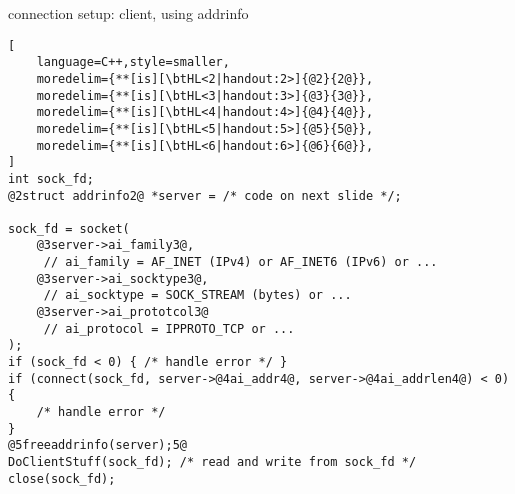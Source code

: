 \begin{frame}[fragile,label=connSetupClientAddrInfo]{connection setup: client, using addrinfo}
\begin{lstlisting}[
    language=C++,style=smaller,
    moredelim={**[is][\btHL<2|handout:2>]{@2}{2@}},
    moredelim={**[is][\btHL<3|handout:3>]{@3}{3@}},
    moredelim={**[is][\btHL<4|handout:4>]{@4}{4@}},
    moredelim={**[is][\btHL<5|handout:5>]{@5}{5@}},
    moredelim={**[is][\btHL<6|handout:6>]{@6}{6@}},
]
int sock_fd; 
@2struct addrinfo2@ *server = /* code on next slide */;

sock_fd = socket(
    @3server->ai_family3@,  
     // ai_family = AF_INET (IPv4) or AF_INET6 (IPv6) or ...
    @3server->ai_socktype3@,
     // ai_socktype = SOCK_STREAM (bytes) or ...
    @3server->ai_prototcol3@
     // ai_protocol = IPPROTO_TCP or ...
);
if (sock_fd < 0) { /* handle error */ }
if (connect(sock_fd, server->@4ai_addr4@, server->@4ai_addrlen4@) < 0) {
    /* handle error */
}
@5freeaddrinfo(server);5@
DoClientStuff(sock_fd); /* read and write from sock_fd */
close(sock_fd);
\end{lstlisting}
\end{frame}

